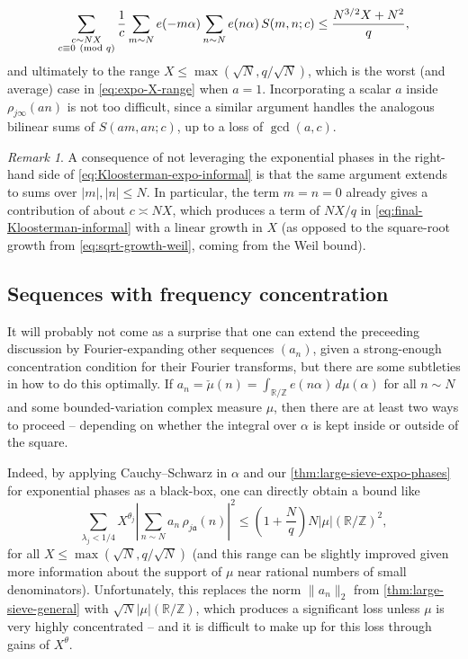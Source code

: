 \documentclass[reqno,11pt]{amsart}
\theoremstyle{remark}
\newtheorem*{remark}{Remark}
\numberwithin{equation}{section}
\newcommand{\Z}{\mathbb{Z}}
\newcommand{\R}{\mathbb{R}}
\newcommand{\ma}{\mathfrak{a}}
\renewcommand{\pmod}[1]{\ (\textnormal{mod } #1)}
\begin{document}
\begin{equation} \label{eq:final-Kloosterman-informal-2}
    \sum_{\substack{c \sim NX \\ c \equiv 0 \pmod{q}}} \frac{1}{c} \sum_{m \sim N} e(-m\alpha) \sum_{n \sim N} e(n\alpha)\, S(m, n; c)
    \le
    \frac{N^{3/2} X + N^2}{q},
\end{equation}
and ultimately to the range $X \le \max(\sqrt{N}, q/\sqrt{N})$, which is the worst (and average) case in \cref{eq:expo-X-range} when $a = 1$. Incorporating a scalar $a$ inside $\rho_{j\infty}(an)$ is not too difficult, since a similar argument handles the analogous bilinear sums of $S(am, an; c)$, up to a loss of $\gcd(a, c)$. 

\begin{remark}
A consequence of not leveraging the exponential phases in the right-hand side of \cref{eq:Kloosterman-expo-informal} is that the same argument extends to sums over $|m|, |n| \le N$. In particular, the term $m = n = 0$ already gives a contribution of about $c \asymp NX$, which produces a term of $NX/q$ in \cref{eq:final-Kloosterman-informal} with a linear growth in $X$ (as opposed to the square-root growth from \cref{eq:sqrt-growth-weil}, coming from the Weil bound).
\end{remark}


\subsection{Sequences with frequency concentration} \label{subsec:overview-freq-conc}

It will probably not come as a surprise that one can extend the preceeding discussion by Fourier-expanding other sequences $(a_n)$, given a strong-enough concentration condition for their Fourier transforms, but there are some subtleties in how to do this optimally. If $a_n = \check{\mu}(n) = \int_{\R/\Z} e(n\alpha)\, d\mu(\alpha)$ for all $n \sim N$ and some bounded-variation complex measure $\mu$, then there are at least two ways to proceed -- depending on whether the integral over $\alpha$ is kept inside or outside of the square. 

Indeed, by applying Cauchy--Schwarz in $\alpha$ and our \cref{thm:large-sieve-expo-phases} for exponential phases as a black-box, one can directly obtain a bound like
\begin{equation} \label{eq:large-sieve-informal-fourier}
    \sum_{\lambda_j < 1/4} X^{\theta_j} \left\vert \sum_{n \sim N} a_n\, \rho_{j\ma}(n) \right\vert^2 \le \left(1 + \frac{N}{q}\right) N |\mu|(\R/\Z)^2,
\end{equation}
for all $X \le \max(\sqrt{N}, q/\sqrt{N})$ (and this range can be slightly improved given more information about the support of $\mu$ near rational numbers of small denominators). Unfortunately, this replaces the norm $\|a_n\|_2$ from \cref{thm:large-sieve-general} with $\sqrt{N} |\mu|(\R/\Z)$, which produces a significant loss unless $\mu$ is very highly concentrated -- and it is difficult to make up for this loss through gains of $X^\theta$. %
\end{document}
